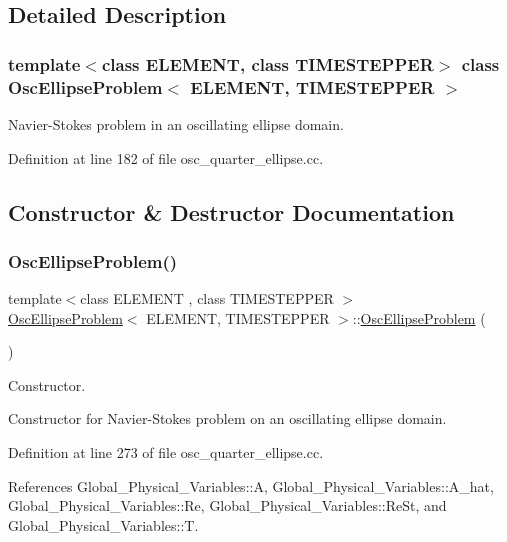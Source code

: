 \subsection{Detailed Description}
\subsubsection*{template$<$class E\+L\+E\+M\+E\+NT, class T\+I\+M\+E\+S\+T\+E\+P\+P\+ER$>$\newline
class Osc\+Ellipse\+Problem$<$ E\+L\+E\+M\+E\+N\+T, T\+I\+M\+E\+S\+T\+E\+P\+P\+E\+R $>$}

Navier-\/\+Stokes problem in an oscillating ellipse domain. 

Definition at line 182 of file osc\+\_\+quarter\+\_\+ellipse.\+cc.



\subsection{Constructor \& Destructor Documentation}
\mbox{\label{classOscEllipseProblem_aaa836937ec963921243fcb990f6fe538}} 
\subsubsection{\texorpdfstring{Osc\+Ellipse\+Problem()}{OscEllipseProblem()}}
{\footnotesize\ttfamily template$<$class E\+L\+E\+M\+E\+NT , class T\+I\+M\+E\+S\+T\+E\+P\+P\+ER $>$ \\
\hyperlink{classOscEllipseProblem}{Osc\+Ellipse\+Problem}$<$ E\+L\+E\+M\+E\+NT, T\+I\+M\+E\+S\+T\+E\+P\+P\+ER $>$\+::\hyperlink{classOscEllipseProblem}{Osc\+Ellipse\+Problem} (\begin{DoxyParamCaption}{ }\end{DoxyParamCaption})}



Constructor. 

Constructor for Navier-\/\+Stokes problem on an oscillating ellipse domain. 

Definition at line 273 of file osc\+\_\+quarter\+\_\+ellipse.\+cc.



References Global\+\_\+\+Physical\+\_\+\+Variables\+::A, Global\+\_\+\+Physical\+\_\+\+Variables\+::\+A\+\_\+hat, Global\+\_\+\+Physical\+\_\+\+Variables\+::\+Re, Global\+\_\+\+Physical\+\_\+\+Variables\+::\+Re\+St, and Global\+\_\+\+Physical\+\_\+\+Variables\+::T.

